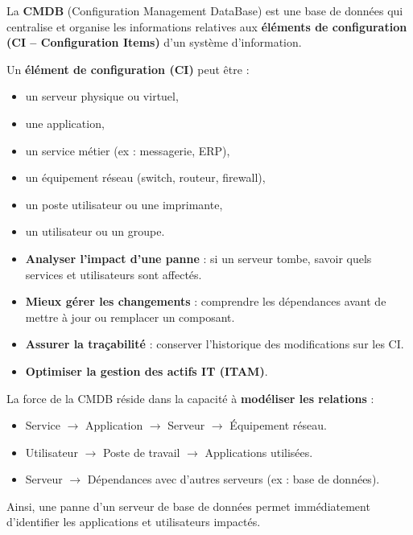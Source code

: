 \documentclass[a4paper,11pt]{article}
\begin{document}
\begin{tcolorbox}[colback=blue!5,colframe=blue!75!black,title={Définition}]
La \textbf{CMDB} (Configuration Management DataBase) est une base de données qui centralise et organise les informations relatives aux \textbf{éléments de configuration (CI – Configuration Items)} d’un système d’information.

Un \textbf{élément de configuration (CI)} peut être :
\begin{itemize}
  \item un serveur physique ou virtuel,
  \item une application,
  \item un service métier (ex : messagerie, ERP),
  \item un équipement réseau (switch, routeur, firewall),
  \item un poste utilisateur ou une imprimante,
  \item un utilisateur ou un groupe.
\end{itemize}
\end{tcolorbox}

\begin{tcolorbox}[colback=green!5,colframe=green!75!black,title={But de la CMDB}]
\begin{itemize}
  \item \textbf{Analyser l’impact d’une panne} : si un serveur tombe, savoir quels services et utilisateurs sont affectés.
  \item \textbf{Mieux gérer les changements} : comprendre les dépendances avant de mettre à jour ou remplacer un composant.
  \item \textbf{Assurer la traçabilité} : conserver l’historique des modifications sur les CI.
  \item \textbf{Optimiser la gestion des actifs IT (ITAM)}.
\end{itemize}
\end{tcolorbox}

\begin{tcolorbox}[colback=orange!5,colframe=orange!75!black,title={Liens entre les CI}]
La force de la CMDB réside dans la capacité à \textbf{modéliser les relations} :
\begin{itemize}
  \item Service $\rightarrow$ Application $\rightarrow$ Serveur $\rightarrow$ Équipement réseau.
  \item Utilisateur $\rightarrow$ Poste de travail $\rightarrow$ Applications utilisées.
  \item Serveur $\rightarrow$ Dépendances avec d’autres serveurs (ex : base de données).
\end{itemize}

Ainsi, une panne d’un serveur de base de données permet immédiatement d’identifier les applications et utilisateurs impactés.
\end{tcolorbox}
\end{document}
